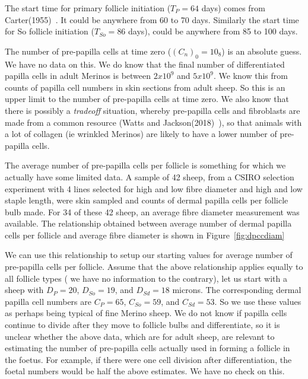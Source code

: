 \documentclass[titlepage]{article}  %
\begin{document}
 The start time for primary follicle initiation ($T_{P} = 64$ days) comes from Carter(1955)~\cite{cart:55}. It could be anywhere from 60 to 70 days. Similarly the start time for So follicle initiation ($T_{So} = 86$ days), could be anywhere from 85 to 100 days.

 The number of pre-papilla cells at time zero ($(C_{n})_{0} = 10_{8}$) is an absolute guess. We have no data on this. We do know that the final number of differentiated papilla cells in adult Merinos is between $2x10^{9}$ and $5x10^{9}$. We know this from counts of papilla cell numbers in skin sections from adult sheep. So this is an upper limit to the number of pre-papilla cells at time zero. We also know that there is possibly a {\em tradeoff} situation, whereby pre-papilla cells and fibroblasts are made from a common resource (Watts and Jackson(2018)~\cite{watt:18}), so that animals with a lot of collagen (ie wrinkled Merinos) are likely to have a lower number of pre-papilla cells.

 The average number of pre-papilla cells per follicle  is something for which we actually have some limited data. A sample of 42 sheep, from a CSIRO selection experiment with  4 lines selected for high and low fibre diameter and high and low staple length, were skin sampled and counts of dermal papilla cells per follicle bulb made. For 34 of these 42 sheep, an average fibre diameter measurement was available. The relationship obtained between average number of dermal papilla cells per follicle and average fibre diameter is shown in Figure~\ref{fig:dpccdiam}

 We can use this relationship to setup our starting values for average number of pre-papilla cells per follicle. Assume that the above relationship applies equally to all follicle types ( we have no information to the contrary), let us start with a sheep with $D_{P}=20$, $D_{So}=19$, and $D_{Sd}=18$ microns. The corresponding dermal papilla cell numbers are $C_{P}=65$, $C_{So}=59$, and $C_{Sd}=53$.  So we use these values as perhaps being typical of fine Merino sheep. We do not know if papilla cells continue to divide after they move to follicle bulbs and differentiate, so it is unclear whether the above data, which are for adult sheep, are relevant to estimating the number of pre-papilla cells actually used in forming a follicle in the foetus. For example, if there were one cell division after differentiation, the foetal numbers would be half the above estimates. We have no check on this.
\end{document}
